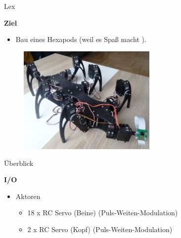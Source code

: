 \documentclass{beamer}
\begin{document}
\begin{frame}{Lex}
\begin{large}\textbf{Ziel}\end{large}
\begin{itemize}
	\item Bau eines Hexapods (weil es Spa\ss{} macht \Smiley{}).
\end{itemize}
 \begin{figure}[H]
  \centering
  \includegraphics[width=0.6\textwidth]{./images/robot-lex.jpg}
 \end{figure}
\end{frame}
\begin{frame}{\"Uberblick}
\begin{large}\textbf{I/O}\end{large}
\begin{itemize}
	\item Aktoren
	\begin{itemize}
		\item 18 x RC Servo (Beine) (Puls-Weiten-Modulation)
		\item 2 x RC Servo (Kopf) (Puls-Weiten-Modulation)
	\end{itemize}
\end{itemize}
\end{frame}
\end{document}
